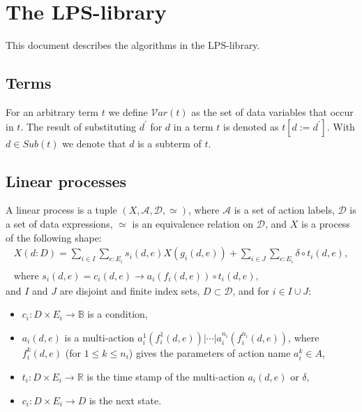 \documentclass{article}
\begin{document}
\section{\protect\bigskip The LPS-library}

This document describes the algorithms in the LPS-library.

\subsection{\protect\bigskip Terms}

For an arbitrary term $t$ we define $\mathcal{V}ar(t)$ as the set of data
variables that occur in $t$. The result of substituting $d^{\prime }$ for $d$
in a term $t$ is denoted as $t[d:=d^{\prime }]$. With $d\in Sub(t)$ we
denote that $d$ is a subterm of $t$.

\subsection{Linear processes}

A linear process is a tuple $(X,\mathcal{A},\mathcal{D},\simeq )$, where $%
\mathcal{A}$ is a set of action labels, $\mathcal{D}$ is a set of data
expressions, $\simeq $ is an equivalence relation on $\mathcal{D}$, and $X$
is a process of the following shape:%
\begin{equation}
\begin{array}{l}
X(d:D)=\sum\limits_{i\in
I}\sum\limits_{e:E_{i}}s_{i}(d,e)X(g_{i}(d,e))+\sum\limits_{i\in
J}\sum\limits_{e:E_{i}}\delta \circ t_{i}(d,e), \\
\\
\text{where }s_{i}(d,e)=c_{i}(d,e)\rightarrow a_{i}(f_{i}(d,e))\circ
t_{i}(d,e),%
\end{array}
\label{eq:lps_timed}
\end{equation}%
and $I$ and $J$ are disjoint and finite index sets, $D\subset \mathcal{D}$,
and for $i\in I\cup J$:

\begin{itemize}
\item $c_{i}:D\times E_{i}\rightarrow \mathbb{B}$ is a condition,

\item $a_{i}(d,e)$ is a multi-action $a_{i}^{1}(f_{i}^{1}(d,e))|\cdots
|a_{i}^{n_{i}}(f_{i}^{n_{i}}(d,e))$, where $f_{i}^{k}(d,e)$ (for $1\leq
k\leq n_{i}$) gives the parameters of action name $a_{i}^{k}\in A$,

\item $t_{i}:D\times E_{i}\rightarrow \mathbb{R}$ is the time stamp of the
multi-action $a_{i}(d,e)$ or $\delta $,

\item $c_{i}:D\times E_{i}\rightarrow D$ is the next state.
\end{itemize}
\end{document}
